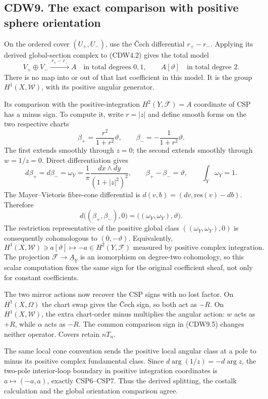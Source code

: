 \subsection{CDW9. The exact comparison with positive sphere
orientation}\label{cdw9.-the-exact-comparison-with-positive-sphere-orientation}

On the ordered cover \((U_+,U_-)\), use the Čech differential
\(r_+-r_-\). Applying its derived global-section complex to (CDW4.2)
gives the total model \[
V_+\oplus V_-\xrightarrow{\ r_+-r_-\ }A
\quad\text{in total degrees }0,1,
\qquad
A[\vartheta]\quad\text{in total degree }2.
\tag{CDW9.1}
\] There is no map into or out of that last coefficient in this model.
It is the group \(H^1(X,\mathscr W)\), with its positive angular
generator.

Its comparison with the positive-integration \(H^2(Y,\mathscr F)=A\)
coordinate of CSP has a minus sign. To compute it, write \(r=|z|\) and
define smooth forms on the two respective charts \[
\beta_+=\frac{r^2}{1+r^2}\vartheta,\qquad
\beta_-=-\frac1{1+r^2}\vartheta.
\tag{CDW9.2}
\] The first extends smoothly through \(z=0\); the second extends
smoothly through \(w=1/z=0\). Direct differentiation gives \[
d\beta_+=d\beta_-=\omega_Y
=\frac1\pi\frac{dx\wedge dy}{(1+|z|^2)^2},
\qquad
\beta_+-\beta_-=\vartheta,\qquad
\int_Y\omega_Y=1.
\tag{CDW9.3}
\] The Mayer--Vietoris fibre-cone differential is
\(d(v,b)=(dv,\mathrm{res}(v)-db)\). Therefore \[
d\bigl((\beta_+,\beta_-),0\bigr)
=\bigl((\omega_Y,\omega_Y),\vartheta\bigr).
\tag{CDW9.4}
\] The restriction representative of the positive global class
\(((\omega_Y,\omega_Y),0)\) is consequently cohomologous to
\((0,-\vartheta)\). Equivalently, \[
\boxed{
H^1(X,\mathscr W)\ni a[\vartheta]
\longmapsto -a\in H^2(Y,\mathscr F)
\text{ measured by positive complex integration}.}
\tag{CDW9.5}
\] The projection \(\mathscr F\to\underline A_Y\) is an isomorphism on
degree-two cohomology, so this scalar computation fixes the same sign
for the original coefficient sheaf, not only for constant coefficients.

The two mirror actions now recover the CSP signs with no lost factor. On
\(H^1(X,\Omega)\) the chart swap gives the Čech sign, so both act as
\(-R\). On \(H^1(X,\mathscr W)\), the extra chart-order minus multiplies
the angular action: \(w\) acts as \(+R\), while \(\alpha\) acts as
\(-R\). The common comparison sign in (CDW9.5) changes neither operator.
Covers retain \(nT_n\).

The same local cone convention sends the positive local angular class at
a pole to minus its positive complex fundamental class. Since
\(d\arg(1/z)=-d\arg z\), the two-pole interior-loop boundary in positive
integration coordinates is \(a\mapsto(-a,a)\), exactly CSP6--CSP7. Thus
the derived splitting, the costalk calculation and the global
orientation comparison agree.

